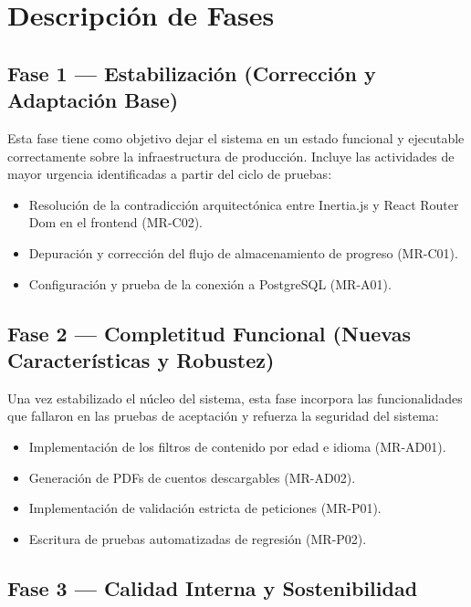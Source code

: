 \newpage
\section{Descripción de Fases}

\subsection{Fase 1 --- Estabilización (Corrección y Adaptación Base)}

Esta fase tiene como objetivo dejar el sistema en un estado funcional y ejecutable
correctamente sobre la infraestructura de producción. Incluye las actividades de
mayor urgencia identificadas a partir del ciclo de pruebas:

\begin{itemize}
    \item Resolución de la contradicción arquitectónica entre Inertia.js y React Router
          Dom en el frontend (MR-C02).
    \item Depuración y corrección del flujo de almacenamiento de progreso (MR-C01).
    \item Configuración y prueba de la conexión a PostgreSQL (MR-A01).
\end{itemize}

\subsection{Fase 2 --- Completitud Funcional (Nuevas Características y Robustez)}

Una vez estabilizado el núcleo del sistema, esta fase incorpora las funcionalidades
que fallaron en las pruebas de aceptación y refuerza la seguridad del sistema:

\begin{itemize}
    \item Implementación de los filtros de contenido por edad e idioma (MR-AD01).
    \item Generación de PDFs de cuentos descargables (MR-AD02).
    \item Implementación de validación estricta de peticiones (MR-P01).
    \item Escritura de pruebas automatizadas de regresión (MR-P02).
\end{itemize}

\subsection{Fase 3 --- Calidad Interna y Sostenibilidad}

